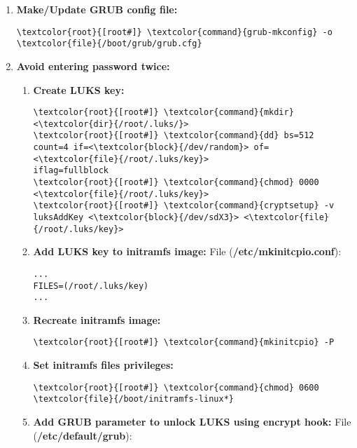 \documentclass[10pt, a4paper, onecolumn, openany]{book} %
\begin{document}
\begin{enumerate}
    \item \textbf{Make/Update GRUB config file:}
\begin{Verbatim}[commandchars=\\\{\}]
\textcolor{root}{[root#]} \textcolor{command}{grub-mkconfig} -o \textcolor{file}{/boot/grub/grub.cfg}
\end{Verbatim}

    \item \textbf{Avoid entering password twice:}
    \begin{enumerate}
        \item \textbf{Create LUKS key:}
\begin{Verbatim}[commandchars=\\\{\}]
\textcolor{root}{[root#]} \textcolor{command}{mkdir} <\textcolor{dir}{/root/.luks/}>
\textcolor{root}{[root#]} \textcolor{command}{dd} bs=512 count=4 if=<\textcolor{block}{/dev/random}> of=<\textcolor{file}{/root/.luks/key}>
iflag=fullblock
\textcolor{root}{[root#]} \textcolor{command}{chmod} 0000 <\textcolor{file}{/root/.luks/key}>
\textcolor{root}{[root#]} \textcolor{command}{cryptsetup} -v luksAddKey <\textcolor{block}{/dev/sdX3}> <\textcolor{file}{/root/.luks/key}>
\end{Verbatim}
    \item \textbf{Add LUKS key to initramfs image:}
\newline File (\textbf{\textcolor{file}{/etc/mkinitcpio.conf}}):
\begin{Verbatim}[commandchars=\\\{\}]
...
FILES=(/root/.luks/key)
...
\end{Verbatim}
    \item \textbf{Recreate initramfs image:}
\begin{Verbatim}[commandchars=\\\{\}]
\textcolor{root}{[root#]} \textcolor{command}{mkinitcpio} -P
\end{Verbatim}
    \item \textbf{Set initramfs files privileges:}
\begin{Verbatim}[commandchars=\\\{\}]
\textcolor{root}{[root#]} \textcolor{command}{chmod} 0600 \textcolor{file}{/boot/initramfs-linux*}
\end{Verbatim}
    \item \textbf{Add GRUB parameter to unlock LUKS using encrypt hook:}
\newline File (\textbf{\textcolor{file}{/etc/default/grub}}):
\begin{Verbatim}[commandchars=\\\{\}]

\end{Verbatim}
\end{enumerate}
\end{enumerate}
\end{document}
